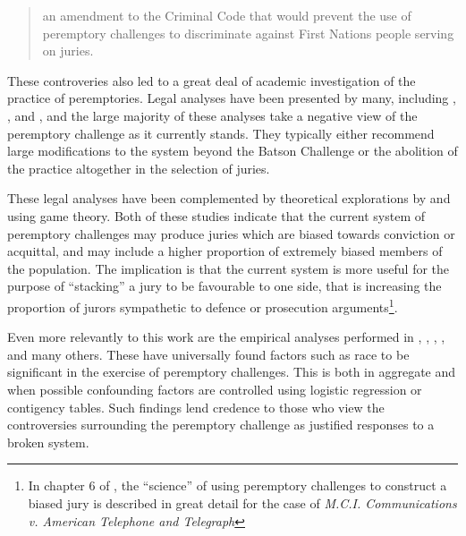\begin{quote}
  an amendment to the Criminal Code that would prevent the use of peremptory challenges to discriminate against First Nations
  people serving on juries.
\end{quote}

These controveries also led to a great deal of academic investigation of the practice of peremptories. Legal analyses have been
presented by many, including \cite{hoffman1997}, \cite{broderick1992}, and \cite{Nunn1993}, and the large majority of these
analyses take a negative view of the peremptory challenge as it currently stands. They typically either recommend large
modifications to the system beyond the Batson Challenge or the abolition of the practice altogether in the selection of
juries.

These legal analyses have been complemented by theoretical explorations by \cite{ford2010} and \cite{flanagan2015} using game
theory. Both of these studies indicate that the current system of peremptory challenges may produce juries which are biased
towards conviction or acquittal, and may include a higher proportion of extremely biased members of the population. The
implication is that the current system is more useful for the purpose of ``stacking'' a jury to be favourable to one side, that is
increasing the proportion of jurors sympathetic to defence or prosecution arguments\footnote{In chapter 6 of
  \cite{hansvidjudging}, the ``science'' of using peremptory challenges to construct a biased jury is described in great detail
  for the case of \textit{M.C.I. Communications v. American Telephone and Telegraph}}.

Even more relevantly to this work are the empirical analyses performed in \cite{PerempChalMurder}, \cite{JurySunshineProj},
\cite{StubbornLegacy}, \cite{baldus2012}, and many others. These have universally found factors such as race to be significant in
the exercise of peremptory challenges. This is both in aggregate and when possible confounding factors are controlled using
logistic regression or contigency tables. Such findings lend credence to those who view the controversies surrounding the
peremptory challenge as justified responses to a broken system.

